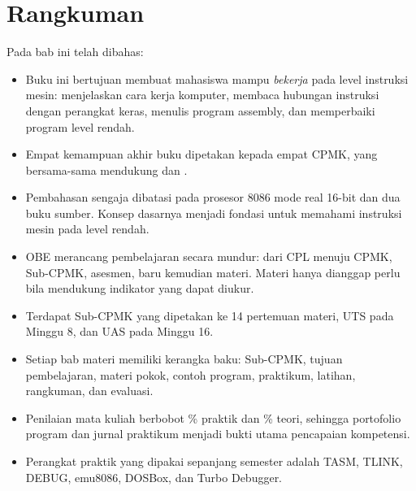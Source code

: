 \section{Rangkuman}
\label{sec:rangkuman-bab1}

Pada bab ini telah dibahas:

\begin{itemize}
    \item Buku ini bertujuan membuat mahasiswa mampu \emph{bekerja}
          pada level instruksi mesin: menjelaskan cara kerja
          komputer, membaca hubungan instruksi dengan perangkat
          keras, menulis program assembly, dan memperbaiki program
          level rendah.

    \item Empat kemampuan akhir buku dipetakan kepada empat CPMK,
          yang bersama-sama mendukung  dan .

    \item Pembahasan sengaja dibatasi pada prosesor 8086 mode real
          16-bit dan dua buku sumber. Konsep dasarnya menjadi fondasi
          untuk memahami instruksi mesin pada level rendah.

    \item OBE merancang pembelajaran secara mundur: dari CPL menuju
          CPMK, Sub-CPMK, asesmen, baru kemudian materi. Materi
          hanya dianggap perlu bila mendukung indikator yang dapat
          diukur.

    \item Terdapat  Sub-CPMK yang dipetakan ke 14 pertemuan
          materi, UTS pada Minggu 8, dan UAS pada Minggu 16.

    \item Setiap bab materi memiliki kerangka baku: Sub-CPMK, tujuan
          pembelajaran, materi pokok, contoh program, praktikum,
          latihan, rangkuman, dan evaluasi.

    \item Penilaian mata kuliah berbobot \% praktik dan
          \% teori, sehingga portofolio program dan jurnal
          praktikum menjadi bukti utama pencapaian kompetensi.

    \item Perangkat praktik yang dipakai sepanjang semester adalah
          TASM, TLINK, DEBUG, emu8086, DOSBox, dan Turbo Debugger.
\end{itemize}


